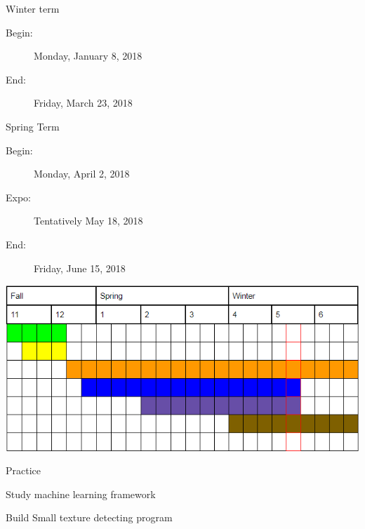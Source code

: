 \documentclass[onecolumn, draftclsnofoot,10pt, compsoc]{IEEEtran}
\begin{document}
Winter term
\begin{description}
	\item[Begin:]Monday, January 8, 2018
	\item[End:]	 Friday, March 23, 2018
\end{description}


Spring Term
\begin{description}
	\item[Begin:]Monday, April 2, 2018
	\item[Expo:] 	Tentatively May 18, 2018
	\item[End:]			Friday, June 15, 2018
\end{description}



\includegraphics[scale = 1]{GantProjectReqs.PNG}


Practice
\begin{description}
	\color{green}
	\item[--]Study machine learning framework
	\color{yellow}
	\item[--]Build Small texture detecting program
\end{description}
\end{document}
